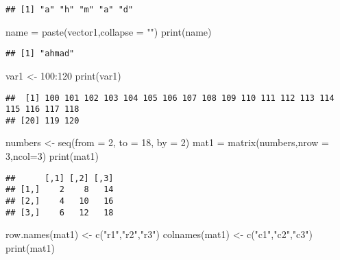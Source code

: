 \documentclass[
]{article}
\newenvironment{Shaded}{\begin{snugshade}}{\end{snugshade}}
\newcommand{\AttributeTok}[1]{\textcolor[rgb]{0.77,0.63,0.00}{#1}}
\newcommand{\DecValTok}[1]{\textcolor[rgb]{0.00,0.00,0.81}{#1}}
\newcommand{\FunctionTok}[1]{\textcolor[rgb]{0.00,0.00,0.00}{#1}}
\newcommand{\NormalTok}[1]{#1}
\newcommand{\OtherTok}[1]{\textcolor[rgb]{0.56,0.35,0.01}{#1}}
\newcommand{\SpecialCharTok}[1]{\textcolor[rgb]{0.00,0.00,0.00}{#1}}
\newcommand{\StringTok}[1]{\textcolor[rgb]{0.31,0.60,0.02}{#1}}
\begin{document}
\begin{verbatim}
## [1] "a" "h" "m" "a" "d"
\end{verbatim}

\begin{Shaded}
\begin{Highlighting}[]
\NormalTok{name }\OtherTok{=} \FunctionTok{paste}\NormalTok{(vector1,}\AttributeTok{collapse =} \StringTok{""}\NormalTok{)}
\FunctionTok{print}\NormalTok{(name)}
\end{Highlighting}
\end{Shaded}

\begin{verbatim}
## [1] "ahmad"
\end{verbatim}

\begin{Shaded}
\begin{Highlighting}[]
\NormalTok{var1 }\OtherTok{\textless{}{-}} \DecValTok{100}\SpecialCharTok{:}\DecValTok{120}
\FunctionTok{print}\NormalTok{(var1)}
\end{Highlighting}
\end{Shaded}

\begin{verbatim}
##  [1] 100 101 102 103 104 105 106 107 108 109 110 111 112 113 114 115 116 117 118
## [20] 119 120
\end{verbatim}

\begin{Shaded}
\begin{Highlighting}[]
\NormalTok{numbers }\OtherTok{\textless{}{-}} \FunctionTok{seq}\NormalTok{(}\AttributeTok{from =} \DecValTok{2}\NormalTok{, }\AttributeTok{to =} \DecValTok{18}\NormalTok{, }\AttributeTok{by =} \DecValTok{2}\NormalTok{)}
\NormalTok{mat1 }\OtherTok{=} \FunctionTok{matrix}\NormalTok{(numbers,}\AttributeTok{nrow =} \DecValTok{3}\NormalTok{,}\AttributeTok{ncol=}\DecValTok{3}\NormalTok{)}
\FunctionTok{print}\NormalTok{(mat1)}
\end{Highlighting}
\end{Shaded}

\begin{verbatim}
##      [,1] [,2] [,3]
## [1,]    2    8   14
## [2,]    4   10   16
## [3,]    6   12   18
\end{verbatim}

\begin{Shaded}
\begin{Highlighting}[]
\FunctionTok{row.names}\NormalTok{(mat1) }\OtherTok{\textless{}{-}} \FunctionTok{c}\NormalTok{(}\StringTok{"r1"}\NormalTok{,}\StringTok{"r2"}\NormalTok{,}\StringTok{"r3"}\NormalTok{)}
\FunctionTok{colnames}\NormalTok{(mat1) }\OtherTok{\textless{}{-}} \FunctionTok{c}\NormalTok{(}\StringTok{"c1"}\NormalTok{,}\StringTok{"c2"}\NormalTok{,}\StringTok{"c3"}\NormalTok{)}
\FunctionTok{print}\NormalTok{(mat1)}
\end{Highlighting}
\end{Shaded}
\end{document}
